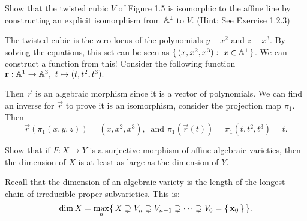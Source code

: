 \documentclass[12pt]{memoir}
\begin{document}
\begin{Ej}
  Show that the twisted cubic $V$ of Figure 1.5 is isomorphic to the affine line by constructing an explicit isomorphism from $\mathbb{A}^1$ to $V$. (Hint: See Exercise 1.2.3)
\end{Ej}

\begin{ptcbr}
The twisted cubic is the zero locus of the polynomials $y-x^2$ and $z-x^3$.
By solving the equations, this set can be seen as $\{\,(x,x^2,x^3):\ x\in\mathbb{A}^1\,\}$. We can construct a function from this! Consider the following function $\vec r:\bA^1\to\bA^3,\ t\mapsto(t,t^2,t^3).$\par 
Then $\vec r$ is an algebraic morphism since it is a vector of polynomials. We can find an inverse for $\vec r$ to prove it is an isomorphism, consider the projection map $\pi_1$. Then 
$$\vec r(\pi_1(x,y,z))=(x,x^2,x^3),\ \text{ and } \pi_1(\vec r(t))=\pi_1(t,t^2,t^3)=t.$$ 
\end{ptcbr}

\begin{Ej}
 Show that if $F:X\to Y$ is a surjective morphism of affine
 algebraic varieties, then the dimension of $ X $ is at least as large as the dimension of $Y$. 
\end{Ej}
%
\begin{ptcbr}
  Recall that the dimension of an algebraic variety is the length of the longest chain of irreducible proper subvarieties. This is:
  $$\dim X=\max_{n}\{\,X\supsetneq V_n\supsetneq V_{n-1}\supsetneq\dots\supsetneq V_0=\{\,\mathbf{x}_0\,\}\,\}.$$

\end{ptcbr}
\end{document}
